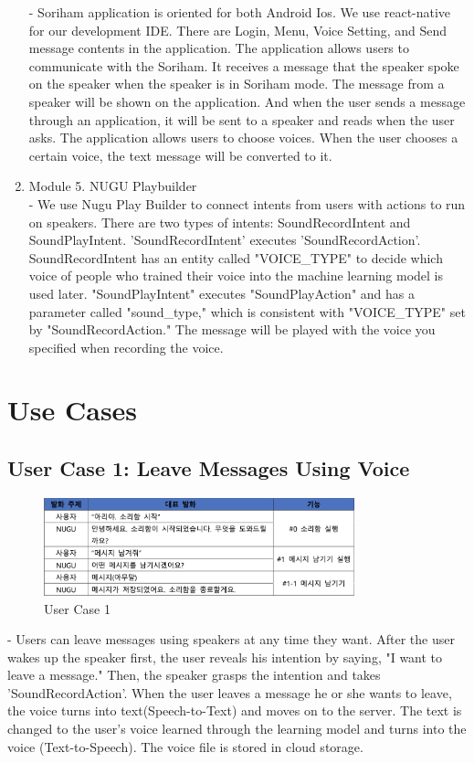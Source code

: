 \documentclass[conference]{IEEEtran}
\begin{document}
\begin{enumerate}
    - Soriham application is oriented for both Android Ios. We use react-native for our development IDE. There are Login, Menu, Voice Setting, and Send message contents in the application. The application allows users to communicate with the Soriham. It receives a message that the speaker spoke on the speaker when the speaker is in Soriham mode. The message from a speaker will be shown on the application. And when the user sends a message through an application, it will be sent to a speaker and reads when the user asks. The application allows users to choose voices. When the user chooses a certain voice, the text message will be converted to it.\\
    \item Module 5. NUGU Playbuilder\\
    - We use Nugu Play Builder to connect intents from users with actions to run on speakers. There are two types of intents: SoundRecordIntent and SoundPlayIntent. 'SoundRecordIntent' executes 'SoundRecordAction'. SoundRecordIntent has an entity called "VOICE\_TYPE" to decide which voice of people who trained their voice into the machine learning model is used later. "SoundPlayIntent" executes "SoundPlayAction" and has a parameter called "sound\_type," which is consistent with "VOICE\_TYPE" set by "SoundRecordAction." The message will be played with the voice you specified when recording the voice.\\
\end{enumerate}

\section{Use Cases}

\subsection{User Case 1: Leave Messages Using Voice}
\begin{figure}[ht!]
    \centerline{\includegraphics[width=9cm]{img/usecase 1.png}}
    \caption{User Case 1}
\end{figure}
- Users can leave messages using speakers at any time they want. After the user wakes up the speaker first, the user reveals his intention by saying, "I want to leave a message." Then, the speaker grasps the intention and takes 'SoundRecordAction'. When the user leaves a message he or she wants to leave, the voice turns into text(Speech-to-Text) and moves on to the server. The text is changed to the user's voice learned through the learning model and turns into the voice (Text-to-Speech). The voice file is stored in cloud storage.\\
\end{document}
